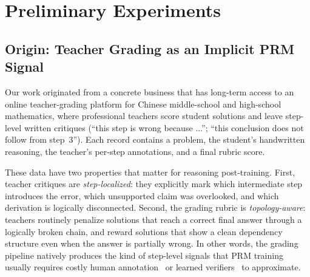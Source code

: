     
    \section{Preliminary Experiments}
    \label{appx:pre_exp}
    \label{appx:private_results}
    
    \subsection{Origin: Teacher Grading as an Implicit PRM Signal}
    Our work originated from a concrete business that has long-term access to an online teacher-grading platform for Chinese middle-school and high-school mathematics, where professional teachers score student solutions and leave step-level written critiques (``this step is wrong because ...''; ``this conclusion does not follow from step~3''). Each record contains a problem, the student's handwritten reasoning, the teacher's per-step annotations, and a final rubric score.
    
    These data have two properties that matter for reasoning post-training. First, teacher critiques are \emph{step-localized}: they explicitly mark which intermediate step introduces the error, which unsupported claim was overlooked, and which derivation is logically disconnected. Second, the grading rubric is \emph{topology-aware}: teachers routinely penalize solutions that reach a correct final answer through a logically broken chain, and reward solutions that show a clean dependency structure even when the answer is partially wrong. In other words, the grading pipeline natively produces the kind of step-level signals that PRM training usually requires costly human annotation~\citep{lightman2023lets,luo2024omegaprm} or learned verifiers~\citep{wang2024math,thinkprm2025,genprm2026} to approximate.
    
